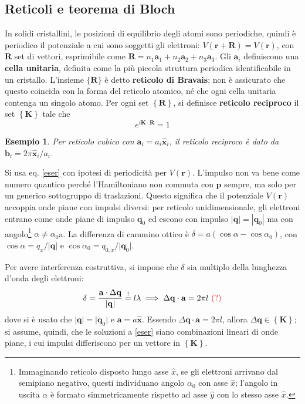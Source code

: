\documentclass[10pt, a4paper]{scrartcl}
\numberwithin{equation}{subsection}
\theoremstyle{style1}
\newtheorem{esempio}{Esempio}[section]
\begin{document}
\subsection{Reticoli e teorema di Bloch}
In solidi cristallini, le posizioni di equilibrio degli atomi sono periodiche, quindi \`e periodico il potenziale a cui sono soggetti gli elettroni: $V(\mathbf{r} +\mathbf{R} ) = V(\mathbf{r} )$, con $\mathbf{R} $ set di vettori, esprimibile come $\mathbf{R} = n_1\mathbf{a} _1 + n_2 \mathbf{a} _2 + n_3 \mathbf{a} _3$. 
Gli $\mathbf{a} _i$ definiscono una \textbf{cella unitaria}, definita come la pi\`u piccola struttura periodica identificabile in un cristallo. 
L'insieme $\{\mathbf{R} \}$ \`e detto \textbf{reticolo di Bravais}; non \`e assicurato che questo coincida con la forma del reticolo atomico, n\'e che ogni cella unitaria contenga un singolo atomo.
Per ogni set $\left\{ \mathbf{R}  \right\} $, si definisce \textbf{reticolo reciproco} il set $\left\{ \mathbf{K}  \right\} $ tale che
\[
e^{i \mathbf{K} \cdot \mathbf{R} }  =1 
\] 
\begin{esempio}
Per reticolo cubico con $\mathbf{a} _i = a_i \hat{\mathbf{x} }_i$, il reticolo reciproco \`e dato da $\mathbf{b} _i = 2\pi \hat{\mathbf{x} }_i / a_i$.
\end{esempio}
Si usa eq. \ref{eser} con ipotesi di periodicit\`a per $V(\mathbf{r} )$. 
L'impulso non va bene come numero quantico perch\'e l'Hamiltoniano non commuta con $\mathbf{p} $ sempre, ma solo per un generico sottogruppo di traslazioni. 
Questo significa che il potenziale $V(\mathbf{r} )$ accoppia onde piane con impulsi diversi: per reticolo unidimensionale, gli elettroni entrano come onde piane di impulso $\mathbf{q} _0$ ed escono con impulso $|\mathbf{q} | = | \mathbf{q} _0|$ ma con angolo\footnote{Immaginando reticolo disposto lungo asse $\hat{x}$, se gli elettroni arrivano dal semipiano negativo, questi individuano angolo $\alpha_0$ con asse $\hat{x}$; l'angolo in uscita $\alpha $ \`e formato simmetricamente rispetto ad asse $\hat{y}$ con lo stesso asse $\hat{x}$.} $\alpha \neq \alpha _0$a. 
La differenza di cammino ottico \`e $\delta = a(\cos \alpha - \cos \alpha _0)$, con $\cos \alpha  = q_x / \lvert \mathbf{q}  \rvert $ e $\cos \alpha _0 = q_{0,x} / \lvert \mathbf{q} _0 \rvert $.

Per avere interferenza costruttiva, si impone che $\delta $ sia multiplo della lunghezza d'onda degli elettroni:
\[
	\delta = \frac{\mathbf{a} \cdot  \Delta \mathbf{q} }{\lvert \mathbf{q}  \rvert } \stackrel{!}{=} l \lambda  \implies \Delta \mathbf{q} \cdot \mathbf{a}  = 2\pi l  \ {\color{red} (?)}
\] 
dove si \`e usato che $\lvert \mathbf{q}  \rvert = \lvert \mathbf{q} _0 \rvert $ e $\mathbf{a } = a \hat{\mathbf{x} }$.
Essendo $\Delta \mathbf{q} \cdot \mathbf{a}  = 2\pi l$, allora $\Delta \mathbf{q} \in \left\{ \mathbf{K}  \right\} $; si assume, quindi, che le soluzioni a \ref{eser} siano combinazioni lineari di onde piane, i cui impulsi differiscono per un vettore in $\left\{ \mathbf{K}  \right\} $.
\end{document}

